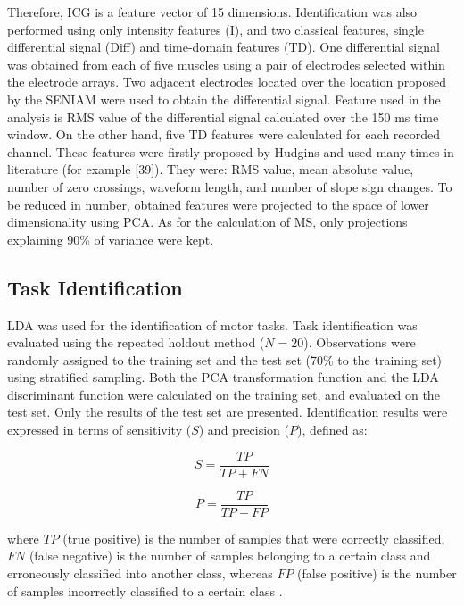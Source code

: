 Therefore, ICG is a feature vector of 15 dimensions. Identification was also performed using only intensity features (I), and two classical features, single differential signal (Diff) and time-domain features (TD). One differential signal was obtained from each of five muscles using a pair of electrodes selected within the electrode arrays. Two adjacent electrodes located over the location proposed by the SENIAM were used to obtain the differential signal. Feature used in the analysis is RMS value of the differential signal calculated over the 150 ms time window. On the other hand, five TD features were calculated for each recorded channel. These features were firstly proposed by Hudgins \citep{Parker2006} and used many times in literature (for example  [39]). They were: RMS value, mean absolute value, number of zero crossings, waveform length, and number of slope sign changes. To be reduced in number, obtained features were projected to the space of lower dimensionality using PCA. As for the calculation of MS, only projections explaining 90\% of variance were kept.


\subsection{Task Identification}
LDA was used for the identification of motor tasks. Task identification was evaluated using the repeated holdout method ($N = 20$). Observations were randomly assigned to the training set and the test set (70\% to the training set) using stratified sampling. Both the PCA transformation function and the LDA discriminant function were calculated on the training set, and evaluated on the test set. Only the results of the test set are presented. Identification results were expressed in terms of sensitivity ($S$) and precision ($P$), defined as:

\begin{equation} \label{eq:3-5}
S = \frac{TP}{TP + FN}
\end{equation}

\begin{equation} \label{eq:3-6}
P = \frac{TP}{TP + FP}
\end{equation}

where $TP$ (true positive) is the number of samples that were correctly classified, $FN$ (false negative) is the number of samples belonging to a certain class and erroneously classified into another class, whereas $FP$ (false positive) is the number of samples incorrectly classified to a certain class \citep{Sokolova2009}.

